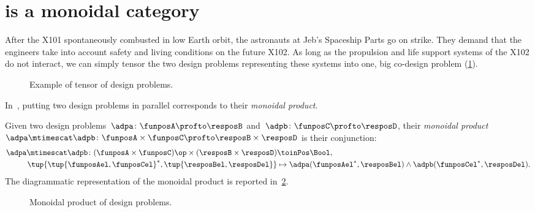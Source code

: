 

\section{\DP is a monoidal category}\label{sec:parallelism-DP-monoidal}
\begin{example}
  After the X101 spontaneously combusted in low Earth orbit, the astronauts at Jeb's Spaceship Parts go on strike. They demand that the engineers take into account safety and living conditions on the future X102. As long as the propulsion and life support systems of the X102 do not interact, we can simply tensor the two design problems representing these systems into one, big co-design problem (\cref{fig:examplemonoidal}).
  \begin{figure}[h!]
    \begin{center}
    \end{center}
    \caption{Example of tensor of design problems. \label{fig:examplemonoidal}}
  \end{figure}
\end{example}
In~\DP, putting two design problems in parallel corresponds to their \emph{monoidal product}.

\begin{definition}
  \label{def:monoidalproduct}
  Given two design problems~$\adpa \colon \funposA \profto \resposB$ and~$\adpb \colon \funposC \profto \resposD$, their \emph{monoidal product}~$\adpa \mtimescat \adpb \colon \funposA \times \funposC \profto \resposB\times \resposD$ is their conjunction:
  \begin{equation}
    \label{eq:monoidalprod_dp}
    \begin{aligned}
      \adpa \mtimescat \adpb \colon (\funposA \times \funposC)\op \times (\resposB \times \resposD) & \toinPos \Bool, \\
      \tup{\tup{\funposAel,\funposCel}^*,\tup{\resposBel,\resposDel}} &\mapsto \adpa(\funposAel^*,\resposBel) \wedge \adpb(\funposCel^*,\resposDel).
    \end{aligned}
  \end{equation}
  The diagrammatic representation of the monoidal product is reported in~\cref{fig:dpmonoidal}.
\end{definition}

\begin{figure}[h!]
  \begin{center}
  \end{center}
  \caption{Monoidal product of design problems. \label{fig:dpmonoidal}}
\end{figure}


